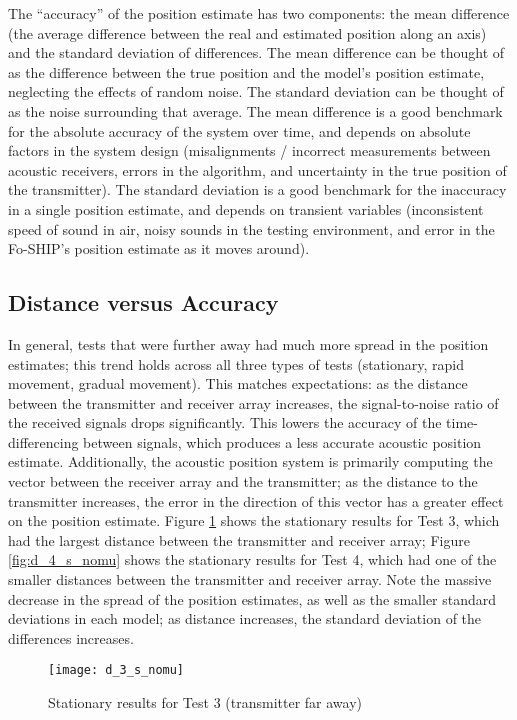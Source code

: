 \documentclass[12pt,a4paper]{report}
\begin{document}
The “accuracy” of the position estimate has two components: the mean difference (the average difference between the real and estimated position along an axis) and the standard deviation of differences. The mean difference can be thought of as the difference between the true position and the model’s position estimate, neglecting the effects of random noise. The standard deviation can be thought of as the noise surrounding that average. The mean difference is a good benchmark for the absolute accuracy of the system over time, and depends on absolute factors in the system design (misalignments / incorrect measurements between acoustic receivers, errors in the algorithm, and uncertainty in the true position of the transmitter). The standard deviation is a good benchmark for the inaccuracy in a single position estimate, and depends on transient variables (inconsistent speed of sound in air, noisy sounds in the testing environment, and error in the Fo-SHIP’s position estimate as it moves around).

\subsection{Distance versus Accuracy} \label{ssec:6s2s1}
In general, tests that were further away had much more spread in the position estimates; this trend holds across all three types of tests (stationary, rapid movement, gradual movement). This matches expectations: as the distance between the transmitter and receiver array increases, the signal-to-noise ratio of the received signals drops significantly. This lowers the accuracy of the time-differencing between signals, which produces a less accurate acoustic position estimate. Additionally, the acoustic position system is primarily computing the vector between the receiver array and the transmitter; as the distance to the transmitter increases, the error in the direction of this vector has a greater effect on the position estimate. Figure \ref{fig:d_3_s_nomu} shows the stationary results for Test 3, which had the largest distance between the transmitter and receiver array; Figure \ref{fig:d_4_s_nomu} shows the stationary results for Test 4, which had one of the smaller distances between the transmitter and receiver array. Note the massive decrease in the spread of the position estimates, as well as the smaller standard deviations in each model; as distance increases, the standard deviation of the differences increases.

\begin{figure}[htbp]
	\centering
	\texttt{[image: d\_3\_s\_nomu]}
	\caption{Stationary results for Test 3 (transmitter far away)}
	\label{fig:d_3_s_nomu}
\end{figure}
\end{document}
